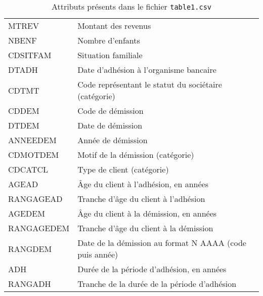 \documentclass{ceri/sty/rapport}
\begin{document}
\begin{table}[htb!]
\begin{tabular}{l l}
             MTREV & Montant des revenus \\
             NBENF & Nombre d’enfants \\
             CDSITFAM & Situation familiale \\
             DTADH & Date d’adhésion à l’organisme bancaire \\
             CDTMT & Code représentant le statut du sociétaire (catégorie) \\
             CDDEM & Code de démission \\
             DTDEM & Date de démission \\
             ANNEEDEM & Année de démission \\
             CDMOTDEM & Motif de la démission (catégorie) \\
             CDCATCL & Type de client (catégorie) \\
             AGEAD & Âge du client à l’adhésion, en années \\
             RANGAGEAD & Tranche d’âge du client à l’adhésion \\
             AGEDEM & Âge du client à la démission, en années \\
             RANGAGEDEM & Tranche d’âge du client à la démission \\
             RANGDEM & Date de la démission au format N AAAA (code puis année) \\
             ADH & Durée de la période d’adhésion, en années \\
             RANGADH & Tranche de la durée de la période d’adhésion \\
		\hline
	\end{tabular}
	\caption[]{Attributs présents dans le fichier \texttt{table1.csv}}
	\label{tab:attrCSV1}
\end{table}
\end{document}
